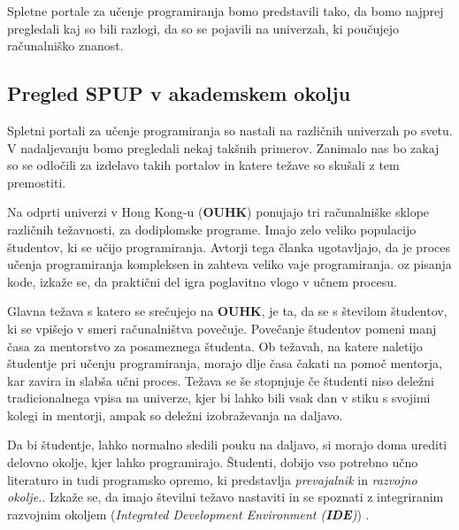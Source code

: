 Spletne portale za učenje programiranja bomo predstavili tako, da bomo
najprej pregledali kaj so bili razlogi, da so se pojavili na
univerzah, ki poučujejo računalniško znanost.



\subsection{Pregled SPUP v akademskem okolju}
\label{sec:pregled_spup_uni}

Spletni portali za učenje programiranja so nastali na različnih
univerzah po svetu. V nadaljevanju bomo pregledali nekaj takšnih
primerov. Zanimalo nas bo zakaj so se odločili za izdelavo takih
portalov in katere težave so skušali z tem premostiti.


Na odprti univerzi v Hong Kong-u (\textbf{OUHK}) ponujajo tri
računalniške sklope različnih težavnosti, za dodiplomske
programe. Imajo zelo veliko populacijo študentov, ki se učijo
programiranja. Avtorji tega članka \cite{ITaLCP_DistanceEdu}
ugotavljajo, da je proces učenja programiranja kompleksen in zahteva
veliko vaje programiranja. oz pisanja kode, izkaže se, da praktični
del igra poglavitno vlogo v učnem procesu.

Glavna težava s katero se srečujejo na \textbf{OUHK}, je ta, da se s
številom študentov, ki se vpišejo v smeri računalništva
povečuje. Povečanje študentov pomeni manj časa za mentorstvo za
posameznega študenta. Ob težavah, na katere naletijo študentje pri
učenju programiranja, morajo dlje časa čakati na pomoč mentorja, kar
zavira in slabša učni proces. Težava se še stopnjuje če študenti niso
deležni tradicionalnega vpisa na univerze, kjer bi lahko bili vsak dan
v stiku s svojimi kolegi in mentorji, ampak so deležni izobraževanja
na daljavo.


Da bi študentje, lahko normalno sledili pouku na daljavo, si morajo
doma urediti delovno okolje, kjer lahko programirajo. Študenti,
dobijo vso potrebno učno literaturo in tudi programsko opremo, ki
predstavlja \emph{prevajalnik} in \emph{razvojno okolje.}. Izkaže se,
da imajo številni težavo nastaviti in se spoznati z integriranim
razvojnim okoljem (\emph{Integrated Development Environment
  (\textbf{IDE})}) \cite{ITaLCP_DistanceEdu}.

